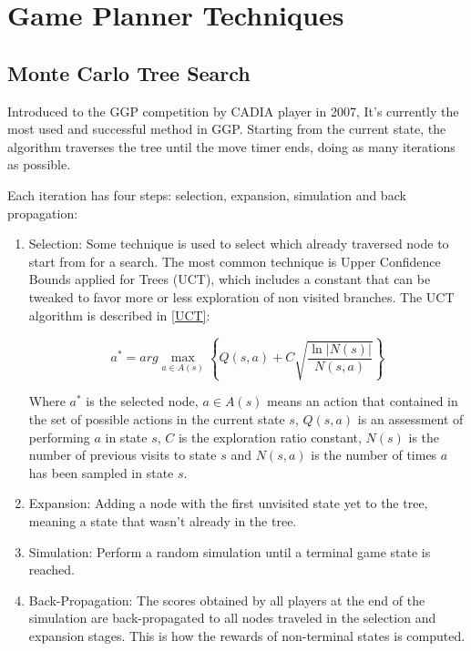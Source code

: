 \section{Game Planner Techniques}
\subsection{Monte Carlo Tree Search}
Introduced to the GGP competition by CADIA player in 2007, It’s currently the most used and successful method in GGP. Starting from the current state, the algorithm traverses the tree until the move timer ends, doing as many iterations as possible.

Each iteration has four steps: selection, expansion, simulation and back propagation:

\begin{enumerate}

\item Selection: Some technique is used to select which already traversed node to start from for a search. The most common technique is Upper Confidence Bounds applied for Trees (UCT), which includes a constant that can be tweaked to favor more or less exploration of non visited branches. The UCT algorithm is described in \ref{UCT}:

\begin{center}
\begin{equation} \label{UCT}
a^{*} = arg \max_{a\in A(s)} \left \{ Q(s,a) + C \sqrt{\frac{\ln|N(s)|} {N(s,a)}} \right \}
\end{equation}
\end{center}

Where $a^{*}$ is the selected node, $a \in A(s)$ means an action that contained in the set of possible actions in the current state $s$, $Q(s,a)$ is an assessment of performing $a$ in state $s$, $C$ is the exploration ratio constant, $N(s)$ is the number of previous visits to state $s$ and $N(s,a)$ is the number of times $a$ has been sampled in state $s$.

\item Expansion: Adding a node with the first unvisited state yet to the tree, meaning a state that wasn’t already in the tree.

\item Simulation: Perform a random simulation until a terminal game state is reached.

\item Back-Propagation: The scores obtained by all players at the end of the simulation are back-propagated to all nodes traveled in the selection and expansion stages. This is how the rewards of non-terminal states is computed.

\end{enumerate}

